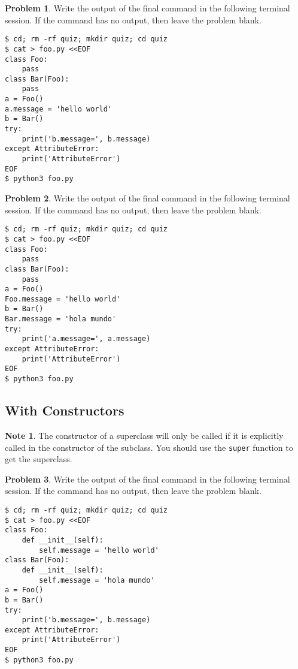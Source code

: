 \documentclass[10pt]{article}
\theoremstyle{definition}
\newtheorem{problem}{Problem}
\newtheorem{note}{Note}
\begin{document}
\filbreak
\begin{problem}
    Write the output of the final command in the following terminal session.
    If the command has no output, then leave the problem blank.
\end{problem}
\begin{lstlisting}
$ cd; rm -rf quiz; mkdir quiz; cd quiz
$ cat > foo.py <<EOF
class Foo:
    pass
class Bar(Foo):
    pass
a = Foo()
a.message = 'hello world'
b = Bar()
try:
    print('b.message=', b.message)
except AttributeError:
    print('AttributeError') 
EOF
$ python3 foo.py
\end{lstlisting}

\filbreak
\begin{problem}
    Write the output of the final command in the following terminal session.
    If the command has no output, then leave the problem blank.
\end{problem}
\begin{lstlisting}
$ cd; rm -rf quiz; mkdir quiz; cd quiz
$ cat > foo.py <<EOF
class Foo:
    pass
class Bar(Foo):
    pass
a = Foo()
Foo.message = 'hello world'
b = Bar()
Bar.message = 'hola mundo'
try:
    print('a.message=', a.message)
except AttributeError:
    print('AttributeError') 
EOF
$ python3 foo.py
\end{lstlisting}

\subsection{With Constructors}

\begin{note}
    The constructor of a superclass will only be called if it is explicitly called in the constructor of the subclass.
    You should use the \lstinline{super} function to get the superclass.
\end{note}

\filbreak
\begin{problem}
    Write the output of the final command in the following terminal session.
    If the command has no output, then leave the problem blank.
\end{problem}
\begin{lstlisting}
$ cd; rm -rf quiz; mkdir quiz; cd quiz
$ cat > foo.py <<EOF
class Foo:
    def __init__(self):
        self.message = 'hello world'
class Bar(Foo):
    def __init__(self):
        self.message = 'hola mundo'
a = Foo()
b = Bar()
try:
    print('b.message=', b.message)
except AttributeError:
    print('AttributeError') 
EOF
$ python3 foo.py
\end{lstlisting}
\end{document}
